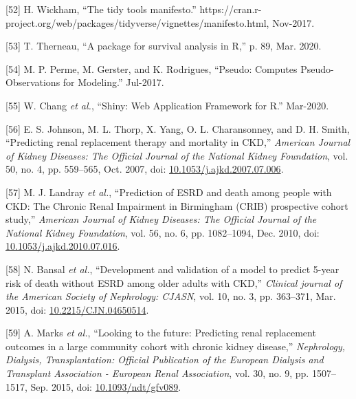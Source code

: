 \documentclass[12pt,PhD,twoside,openright]{muthesis}
\newenvironment{cslreferences}%
  {}%
  {\par}
\begin{document}
\begin{cslreferences}
\leavevmode\hypertarget{ref-wickham_tidy_2017}{}%
{[}52{]} H. Wickham, ``The tidy tools manifesto.'' https://cran.r-project.org/web/packages/tidyverse/vignettes/manifesto.html, Nov-2017.

\leavevmode\hypertarget{ref-therneau_package_2020}{}%
{[}53{]} T. Therneau, ``A package for survival analysis in R,'' p. 89, Mar. 2020.

\leavevmode\hypertarget{ref-perme_pseudo_2017}{}%
{[}54{]} M. P. Perme, M. Gerster, and K. Rodrigues, ``Pseudo: Computes Pseudo-Observations for Modeling.'' Jul-2017.

\leavevmode\hypertarget{ref-chang_shiny_2020}{}%
{[}55{]} W. Chang \emph{et al.}, ``Shiny: Web Application Framework for R.'' Mar-2020.

\leavevmode\hypertarget{ref-johnson_predicting_2007}{}%
{[}56{]} E. S. Johnson, M. L. Thorp, X. Yang, O. L. Charansonney, and D. H. Smith, ``Predicting renal replacement therapy and mortality in CKD,'' \emph{American Journal of Kidney Diseases: The Official Journal of the National Kidney Foundation}, vol. 50, no. 4, pp. 559--565, Oct. 2007, doi: \href{https://doi.org/10.1053/j.ajkd.2007.07.006}{10.1053/j.ajkd.2007.07.006}.

\leavevmode\hypertarget{ref-landray_prediction_2010}{}%
{[}57{]} M. J. Landray \emph{et al.}, ``Prediction of ESRD and death among people with CKD: The Chronic Renal Impairment in Birmingham (CRIB) prospective cohort study,'' \emph{American Journal of Kidney Diseases: The Official Journal of the National Kidney Foundation}, vol. 56, no. 6, pp. 1082--1094, Dec. 2010, doi: \href{https://doi.org/10.1053/j.ajkd.2010.07.016}{10.1053/j.ajkd.2010.07.016}.

\leavevmode\hypertarget{ref-bansal_development_2015}{}%
{[}58{]} N. Bansal \emph{et al.}, ``Development and validation of a model to predict 5-year risk of death without ESRD among older adults with CKD,'' \emph{Clinical journal of the American Society of Nephrology: CJASN}, vol. 10, no. 3, pp. 363--371, Mar. 2015, doi: \href{https://doi.org/10.2215/CJN.04650514}{10.2215/CJN.04650514}.

\leavevmode\hypertarget{ref-marks_looking_2015}{}%
{[}59{]} A. Marks \emph{et al.}, ``Looking to the future: Predicting renal replacement outcomes in a large community cohort with chronic kidney disease,'' \emph{Nephrology, Dialysis, Transplantation: Official Publication of the European Dialysis and Transplant Association - European Renal Association}, vol. 30, no. 9, pp. 1507--1517, Sep. 2015, doi: \href{https://doi.org/10.1093/ndt/gfv089}{10.1093/ndt/gfv089}.


\end{cslreferences}
\end{document}
